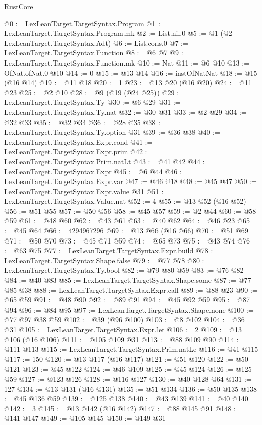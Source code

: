 \begin{lexlean}{RustCore}
\begin{coremodule}
@0 := LexLeanTarget.TargetSyntax.Program
@1 := LexLeanTarget.TargetSyntax.Program.mk
@2 := List.nil.{0}
@5 := @1 (@2 LexLeanTarget.TargetSyntax.Adt)
@6 := List.cons.{0}
@7 := LexLeanTarget.TargetSyntax.Function
@8 := @6 @7
@9 := LexLeanTarget.TargetSyntax.Function.mk
@10 := Nat
@11 := @6 @10
@13 := OfNat.ofNat.{0} @10
@14 := 0
@15 := @13 @14
@16 := instOfNatNat
@18 := @15 (@16 @14)
@19 := @11 @18
@20 := 1
@23 := @13 @20 (@16 @20)
@24 := @11 @23
@25 := @2 @10
@28 := @9 (@19 (@24 @25))
@29 := LexLeanTarget.TargetSyntax.Ty
@30 := @6 @29
@31 := LexLeanTarget.TargetSyntax.Ty.nat
@32 := @30 @31
@33 := @2 @29
@34 := @32 @33
@35 := @32 @34
@36 := @28 @35
@38 := LexLeanTarget.TargetSyntax.Ty.option @31
@39 := @36 @38
@40 := LexLeanTarget.TargetSyntax.Expr.cond
@41 := LexLeanTarget.TargetSyntax.Expr.prim
@42 := LexLeanTarget.TargetSyntax.Prim.natLt
@43 := @41 @42
@44 := LexLeanTarget.TargetSyntax.Expr
@45 := @6 @44
@46 := LexLeanTarget.TargetSyntax.Expr.var
@47 := @46 @18
@48 := @45 @47
@50 := LexLeanTarget.TargetSyntax.Expr.value @31
@51 := LexLeanTarget.TargetSyntax.Value.nat
@52 := 4
@55 := @13 @52 (@16 @52)
@56 := @51 @55
@57 := @50 @56
@58 := @45 @57
@59 := @2 @44
@60 := @58 @59
@61 := @48 @60
@62 := @43 @61
@63 := @40 @62
@64 := @46 @23
@65 := @45 @64
@66 := 4294967296
@69 := @13 @66 (@16 @66)
@70 := @51 @69
@71 := @50 @70
@73 := @45 @71 @59
@74 := @65 @73
@75 := @43 @74
@76 := @63 @75
@77 := LexLeanTarget.TargetSyntax.Expr.build
@78 := LexLeanTarget.TargetSyntax.Shape.false
@79 := @77 @78
@80 := LexLeanTarget.TargetSyntax.Ty.bool
@82 := @79 @80 @59
@83 := @76 @82
@84 := @40 @83
@85 := LexLeanTarget.TargetSyntax.Shape.some
@87 := @77 @85 @38
@88 := LexLeanTarget.TargetSyntax.Expr.call
@89 := @88 @23
@90 := @65 @59
@91 := @48 @90
@92 := @89 @91
@94 := @45 @92 @59
@95 := @87 @94
@96 := @84 @95
@97 := LexLeanTarget.TargetSyntax.Shape.none
@100 := @77 @97 @38 @59
@102 := @39 (@96 @100)
@103 := @8 @102
@104 := @36 @31
@105 := LexLeanTarget.TargetSyntax.Expr.let
@106 := 2
@109 := @13 @106 (@16 @106)
@111 := @105 @109 @31
@113 := @88 @109 @90
@114 := @111 @113
@115 := LexLeanTarget.TargetSyntax.Prim.natLe
@116 := @41 @115
@117 := 150
@120 := @13 @117 (@16 @117)
@121 := @51 @120
@122 := @50 @121
@123 := @45 @122
@124 := @46 @109
@125 := @45 @124
@126 := @125 @59
@127 := @123 @126
@128 := @116 @127
@130 := @40 @128 @64
@131 := 127
@134 := @13 @131 (@16 @131)
@135 := @51 @134
@136 := @50 @135
@138 := @45 @136 @59
@139 := @125 @138
@140 := @43 @139
@141 := @40 @140
@142 := 3
@145 := @13 @142 (@16 @142)
@147 := @88 @145 @91
@148 := @141 @147
@149 := @105 @145
@150 := @149 @31

\end{coremodule}
\end{lexlean}
